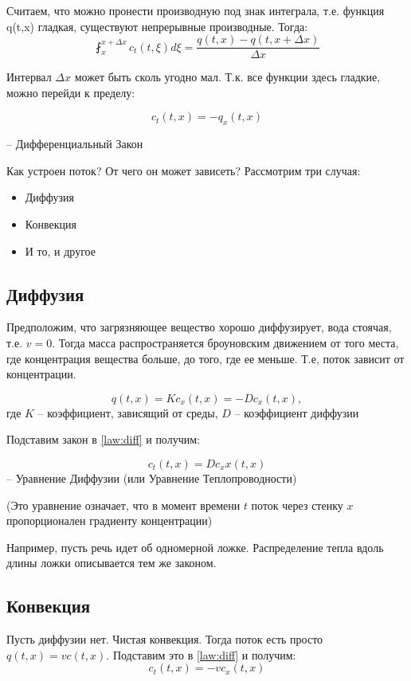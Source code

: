 \documentclass[12pt]{report}
\begin{document}
Считаем, что можно пронести производную под знак интеграла, т.е. функция q(t,x) гладкая, существуют непрерывные производные. Тогда: 
$$
    \fint_{x}^{x + \Delta x}{c_t(t, \xi)d\xi} = \frac{q(t,x) - q(t, x+ \Delta x)}{\Delta x}
$$

Интервал $\Delta x$ может быть сколь угодно мал. Т.к. все функции здесь гладкие, можно перейди к пределу: 

\begin{equation} \label {law:diff}
    c_t(t, x) = - q_x(t,x)    
\end{equation}

    -- Дифференциальный Закон


Как устроен поток? От чего он может зависеть? Рассмотрим три случая:
\begin{itemize}
    \item Диффузия
    \item Конвекция
    \item И то, и другое
\end{itemize}

\subsection{Диффузия}

Предположим, что загрязняющее вещество хорошо диффузирует, вода стоячая, т.е. $v=0$. Тогда масса распространяется броуновским движением от того места, где концентрация вещества больше, до того, где ее меньше. 
Т.е, поток зависит от концентрации.

$$q(t,x) = Kc_x(t,x) = -Dc_x(t,x),$$
где $K$ -- коэффициент, зависящий от среды, $D$ -- коэффициент диффузии

Подставим закон в \eqref{law:diff} и получим: 

\begin{equation} \label{eq:diffusion}
    c_t(t,x) = Dc_xx(t,x)
\end{equation}
    -- Уравнение Диффузии (или Уравнение Теплопроводности)
    
(Это уравнение означает, что в момент времени $t$ поток через стенку $x$ пропорционален градиенту концентрации)
    
Например, пусть речь идет об одномерной ложке. Распределение тепла вдоль длины ложки описывается тем же законом.

\subsection{Конвекция}
Пусть диффузии нет. Чистая конвекция. Тогда поток есть просто $q(t,x) = vc(t,x)$.
Подставим это в \eqref{law:diff} и получим: 
$$c_t(t,x) = -vc_x(t,x)$$
\end{document}
